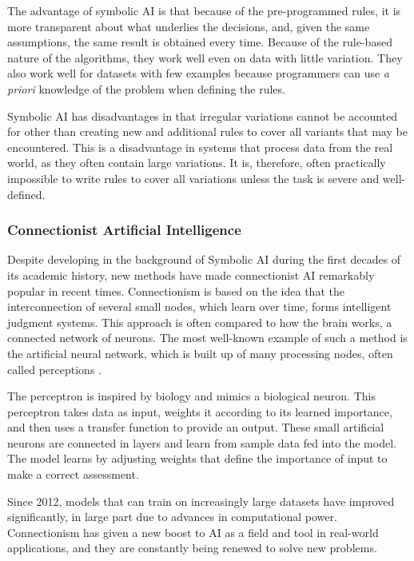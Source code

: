 The advantage of symbolic AI is that because of the pre-programmed rules, it is more transparent about what underlies the decisions, and, given the same assumptions, the same result is obtained every time. Because of the rule-based nature of the algorithms, they work well even on data with little variation. They also work well for datasets with few examples because programmers can use \textit{a priori} knowledge of the problem when defining the rules.

Symbolic AI has disadvantages in that irregular variations cannot be accounted for other than creating new and additional rules to cover all variants that may be encountered. This is a disadvantage in systems that process data from the real world, as they often contain large variations. It is, therefore, often practically impossible to write rules to cover all variations unless the task is severe and well-defined.


\subsubsection{Connectionist Artificial Intelligence}
Despite developing in the background of Symbolic AI during the first decades of its academic history, new methods have made connectionist AI remarkably popular in recent times. Connectionism is based on the idea that the interconnection of several small nodes, which learn over time, forms intelligent judgment systems. This approach is often compared to how the brain works, a connected network of neurons. The most well-known example of such a method is the artificial neural network, which is built up of many processing nodes, often called perceptions \cite{mccullochLogicalCalculusIdeas1943}.

The perceptron is inspired by biology and mimics a biological neuron. This perceptron takes data as input, weights it according to its learned importance, and then uses a transfer function to provide an output. These small artificial neurons are connected in layers and learn from sample data fed into the model. The model learns by adjusting weights that define the importance of input to make a correct assessment.

Since 2012, models that can train on increasingly large datasets have improved significantly, in large part due to advances in computational power. Connectionism has given a new boost to AI as a field and tool in real-world applications, and they are constantly being renewed to solve new problems.

